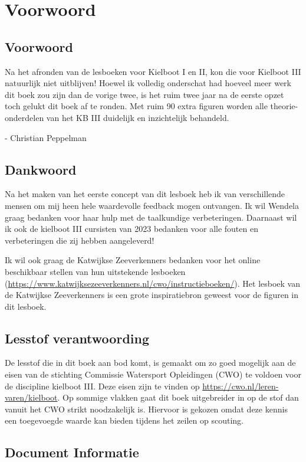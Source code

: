 \chapter*{Voorwoord}

\section{Voorwoord}
Na het afronden van de lesboeken voor Kielboot I en II, kon die voor Kielboot III natuurlijk niet uitblijven! Hoewel ik volledig onderschat had hoeveel meer werk dit boek zou zijn dan de vorige twee, is het ruim twee jaar na de eerste opzet toch gelukt dit boek af te ronden. Met ruim 90 extra figuren worden alle theorie-onderdelen van het KB III duidelijk en inzichtelijk behandeld.

- Christian Peppelman
\section{Dankwoord}
Na het maken van het eerste concept van dit lesboek heb ik van verschillende mensen om mij heen hele waardevolle feedback mogen ontvangen. Ik wil Wendela graag bedanken voor haar hulp met de taalkundige verbeteringen. Daarnaast wil ik ook de kielboot III cursisten van 2023 bedanken voor alle fouten en verbeteringen die zij hebben aangeleverd!

Ik wil ook graag de Katwijkse Zeeverkenners bedanken voor het online beschikbaar stellen van hun uitstekende lesboeken (\url{https://www.katwijksezeeverkenners.nl/cwo/instructieboeken/}). Het lesboek van de Katwijkse Zeeverkenners is een grote inspiratiebron geweest voor de figuren in dit lesboek.


\section{Lesstof verantwoording}
De lesstof die in dit boek aan bod komt, is gemaakt om zo goed mogelijk aan de eisen van de stichting Commissie Watersport Opleidingen (CWO) te voldoen voor de discipline kielboot III. Deze eisen zijn te vinden op \url{https://cwo.nl/leren-varen/kielboot}. Op sommige vlakken gaat dit boek uitgebreider in op de stof dan vanuit het CWO strikt noodzakelijk is. Hiervoor is gekozen omdat deze kennis een toegevoegde waarde kan bieden tijdens het zeilen op scouting.

\vfil\newpage

\section{Document Informatie}
